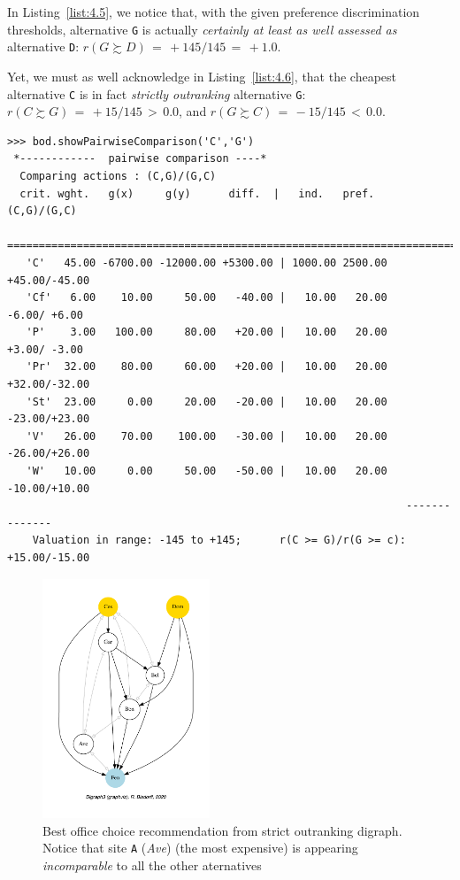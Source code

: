 In Listing~\vref{list:4.5}, we notice that, with the given preference discrimination thresholds, alternative \texttt{G} is actually \emph{certainly at least as well assessed as} alternative \texttt{D}:  $r(G \succsim D)\, = \, +145/145\, =\, +1.0$.

Yet, we must as well acknowledge in Listing~\vref{list:4.6}, that the cheapest alternative \texttt{C} is in fact \emph{strictly outranking} alternative \texttt{G}:  $r(C \succsim G)\, =\, +15/145\, >\, 0.0$, and $r(G \succsim C)\, =\, -15/145 \,<\, 0.0$.
\begin{lstlisting}[caption={Inspecting pairwise comparison between alternatives \texttt{C} and \texttt{G}},label=list:4.6,basicstyle=\ttfamily\scriptsize]
>>> bod.showPairwiseComparison('C','G')
 *------------  pairwise comparison ----*
  Comparing actions : (C,G)/(G,C)
  crit. wght.   g(x)     g(y)      diff.  |   ind.   pref.       (C,G)/(G,C)
   ==========================================================================
   'C'   45.00 -6700.00 -12000.00 +5300.00 | 1000.00 2500.00    +45.00/-45.00 
   'Cf'   6.00    10.00     50.00   -40.00 |   10.00   20.00     -6.00/ +6.00 
   'P'    3.00   100.00     80.00   +20.00 |   10.00   20.00     +3.00/ -3.00 
   'Pr'  32.00    80.00     60.00   +20.00 |   10.00   20.00    +32.00/-32.00 
   'St'  23.00     0.00     20.00   -20.00 |   10.00   20.00    -23.00/+23.00 
   'V'   26.00    70.00    100.00   -30.00 |   10.00   20.00    -26.00/+26.00 
   'W'   10.00     0.00     50.00   -50.00 |   10.00   20.00    -10.00/+10.00
                                                               --------------
    Valuation in range: -145 to +145;      r(C >= G)/r(G >= c): +15.00/-15.00
\end{lstlisting}
\begin{figure}[ht]
\sidecaption[t]
\includegraphics[width=5cm]{Figures/4-3-bestOfficeChoice.pdf}
\caption{Best office choice recommendation from strict outranking digraph. Notice that site \texttt{A} (\emph{Ave}) (the most expensive) is appearing \emph{incomparable} to all the other aternatives}
\label{fig:4.3}       %
\end{figure}

